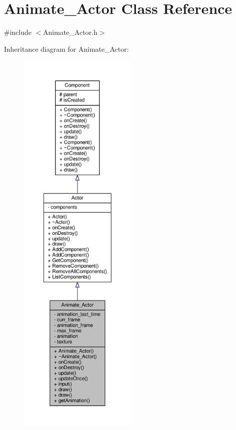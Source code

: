 \hypertarget{classAnimate__Actor}{}\section{Animate\+\_\+\+Actor Class Reference}
\label{classAnimate__Actor}


{\ttfamily \#include $<$Animate\+\_\+\+Actor.\+h$>$}



Inheritance diagram for Animate\+\_\+\+Actor\+:
\nopagebreak
\begin{figure}[H]
\begin{center}
\leavevmode
\includegraphics[height=550pt]{classAnimate__Actor__inherit__graph}
\end{center}
\end{figure}


